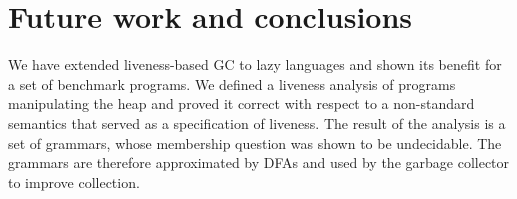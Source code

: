 \documentclass[9pt]{sigplanconf}
\begin{document}
\vspace*{-2mm}
\vskip -5mm
\section{Future work and conclusions}
\label{sec:conclusion}



We have  extended liveness-based  GC  to lazy
  languages  and shown  its benefit  for a  set of  benchmark
  programs.  We  defined a liveness analysis  of programs manipulating
  the  heap and  proved  it  correct with  respect  to a  non-standard
  semantics that served as a specification of liveness.  The result of
  the analysis  is a  set of grammars,  whose membership  question was
  shown to be undecidable. The  grammars are therefore approximated by
  DFAs and used by the garbage collector to improve collection.
\end{document}
